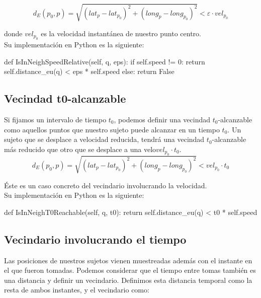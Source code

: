 \documentclass[a4paper, 12pt]{article}
\begin{document}
$$ d_E(p_0, p) = \sqrt{(lat_{p} - lat_{p_0})^2 + (long_{p} - long_{p_0})^2 } < \varepsilon \cdot vel_{p_0} $$

donde $vel_{p_0}$ es la velocidad instant\'anea de nuestro punto centro.\\


Su implementaci\'on en Python es la siguiente:\\

\begin{python}
        def IsInNeighSpeedRelative(self, q, eps):
			if self.speed != 0:
				return self.distance_eu(q) < eps * self.speed	
			else:
				return False
\end{python}


\subsection{Vecindad t0-alcanzable}

Si fijamos un intervalo de tiempo $t_0$, podemos definir una vecindad $t_0$-alcanzable como aquellos puntos que nuestro sujeto puede alcanzar en un tiempo $t_0$. Un sujeto que se desplace a velocidad reducida, tendr\'a una vecindad $t_0$-alcanzable m\'as reducido  que otro que se desplace a una velo$vel_{p_0}\cdot t_0$.  \\

$$ d_E(p_0, p) = \sqrt{(lat_{p} - lat_{p_0})^2 + (long_{p} - long_{p_0})^2 } < vel_{p_0} \cdot t_0 $$

\'Este es un caso concreto del vecindario involucrando la velocidad. \\


Su implementaci\'on en Python es la siguiente:\\

\begin{python}
        def IsInNeighT0Reachable(self, q, t0):
                return self.distance_eu(q) < t0 * self.speed
\end{python}

\subsection{Vecindario involucrando el tiempo}

Las posiciones de nuestros sujetos vienen muestreadas adem\'as con el instante en el que fueron tomadas. Podemos considerar que el tiempo entre tomas tambi\'en es una distancia y definir un vecindario. Definimos esta distancia temporal como la resta de ambos instantes, y el vecindario como: \\
\end{document}
